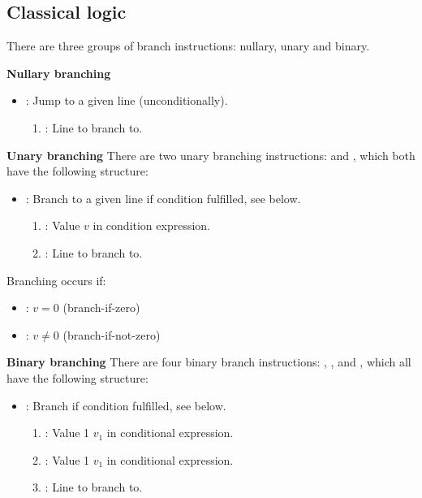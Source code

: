 \subsection{Classical logic}

There are three groups of branch instructions: nullary, unary and binary.

\textbf{Nullary branching}
\begin{itemize}
  \item {}: Jump to a given line (unconditionally).
        \begin{enumerate}
          \item \IMMEDIATE: Line to branch to.
        \end{enumerate}
\end{itemize}

\textbf{Unary branching}
There are two unary branching instructions:  and , which both have the following structure:
\begin{itemize}
  \item {}: Branch to a given line if condition fulfilled, see below.
        \begin{enumerate}
          \item \REGISTER: Value $v$ in condition expression.
          \item \IMMEDIATE: Line to branch to.
        \end{enumerate}
\end{itemize}

Branching occurs if:
\begin{itemize}
  \item {}: $v = 0$ (branch-if-zero)
  \item {}: $v \neq 0$ (branch-if-not-zero)
\end{itemize}

\textbf{Binary branching}
There are four binary branch instructions: , ,  and , which all have the following structure:
\begin{itemize}
  \item {}: Branch if condition fulfilled, see below.
        \begin{enumerate}
          \item \REGISTER: Value 1 $v_1$ in conditional expression.
          \item \REGISTER: Value 1 $v_1$ in conditional expression.
          \item \IMMEDIATE: Line to branch to.
        \end{enumerate}
\end{itemize}

